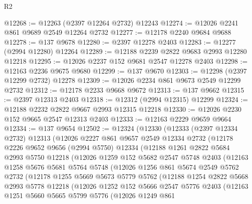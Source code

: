 \begin{lexlean}{R2}
\begin{coremodule}
@12268 := @12263 (@2397 @12264 @2732) @12243
@12274 := @12026 @2241 @861 @9689 @2549 @12264 @2732
@12277 := @12178 @2240 @9684 @9688
@12278 := @137 @9678
@12280 := @2397 @12278 @2403
@12283 := @12277 (@2994 @12280) @12264
@12289 := @12188 @2239 @2822 @9683 @2993 @12280 @12218
@12295 := @12026 @2237 @152 @9681 @2547 @12278 @2403
@12298 := @12163 @2236 @9675 @9680
@12299 := @137 @9670
@12303 := @12298 (@2397 @12299 @2732) @12278
@12309 := @12026 @2234 @861 @9673 @2549 @12299 @2732
@12312 := @12178 @2233 @9668 @9672
@12313 := @137 @9662
@12315 := @2397 @12313 @2403
@12318 := @12312 (@2994 @12315) @12299
@12324 := @12188 @2232 @2822 @9667 @2993 @12315 @12218
@12330 := @12026 @2230 @152 @9665 @2547 @12313 @2403
@12333 := @12163 @2229 @9659 @9664
@12334 := @137 @9654
@12502 := @12324
    (@12330
      (@12333
        (@2397 @12334 @2732)
        @12313
        (@12026
          @2227
          @861
          @9657
          @2549
          @12334
          @2732
          (@12178
            @2226
            @9652
            @9656
            (@2994 @5750)
            @12334
            (@12188
              @1261
              @2822
              @5684
              @2993
              @5750
              @12218
              (@12026
                @1259
                @152
                @5682
                @2547
                @5748
                @2403
                (@12163
                  @1258
                  @5676
                  @5681
                  @5764
                  @5748
                  (@12026
                    @1256
                    @861
                    @5674
                    @2549
                    @5762
                    @2732
                    (@12178
                      @1255
                      @5669
                      @5673
                      @5779
                      @5762
                      (@12188
                        @1254
                        @2822
                        @5668
                        @2993
                        @5778
                        @12218
                        (@12026
                          @1252
                          @152
                          @5666
                          @2547
                          @5776
                          @2403
                          (@12163
                            @1251
                            @5660
                            @5665
                            @5799
                            @5776
                            (@12026
                              @1249
                              @861

\end{coremodule}
\end{lexlean}
